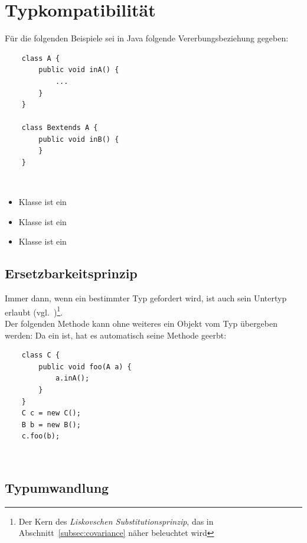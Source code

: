 \section{Typkompatibilität}\label{sec:typecompatibility}




Für die folgenden Beispiele sei in Java folgende Vererbungsbeziehung gegeben:

\begin{verbatim}
    class A {
        public void inA() {
            ...
        }
    }

    class Bextends A {
        public void inB() {
        }
    }
\end{verbatim}\\

\begin{itemize}
    \item Klasse  ist ein 
    \item Klasse  ist ein 
    \item Klasse  ist ein 
\end{itemize}

\subsection{Ersetzbarkeitsprinzip}

Immer dann, wenn ein bestimmter Typ gefordert wird, ist auch sein Untertyp erlaubt (vgl.~\cite[466]{Ull23})\footnote{
Der Kern des \textit{Liskovschen Substitutionsprinzip}, das in Abschnitt~\ref{subsec:covariance} näher beleuchtet wird
}.\\

\noindent
Der folgenden Methode kann ohne weiteres ein Objekt vom Typ  übergeben werden: Da  ein  ist,
hat es automatisch seine Methode  geerbt:

\begin{verbatim}
    class C {
        public void foo(A a) {
            a.inA();
        }
    }
    C c = new C();
    B b = new B();
    c.foo(b);
\end{verbatim}\\

\subsection{Typumwandlung}

